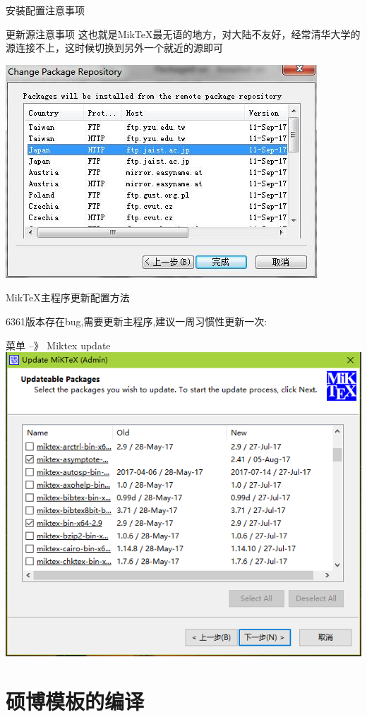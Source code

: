 \documentclass[sectioncirclenumberstyle]{le2iutbmbeamer}
\begin{document}
\begin{frame}{安装配置注意事项}
\begin{alertblock}{更新源注意事项}
    这也就是Mik\TeX{}最无语的地方，对大陆不友好，经常清华大学的源连接不上，这时候切换到另外一个就近的源即可
    
\end{alertblock}
\centering
\includegraphics[height=0.5\linewidth]{figures/12}
\end{frame}
\begin{frame}{Mik\TeX{}主程序更新配置方法}

\alert{6361版本存在bug,需要更新主程序,建议一周习惯性更新一次}:

菜单 --》 Miktex  update
\centering
\includegraphics[height=0.6\linewidth]{figures/7}
\end{frame}

\section{硕博模板的编译}
\end{document}
